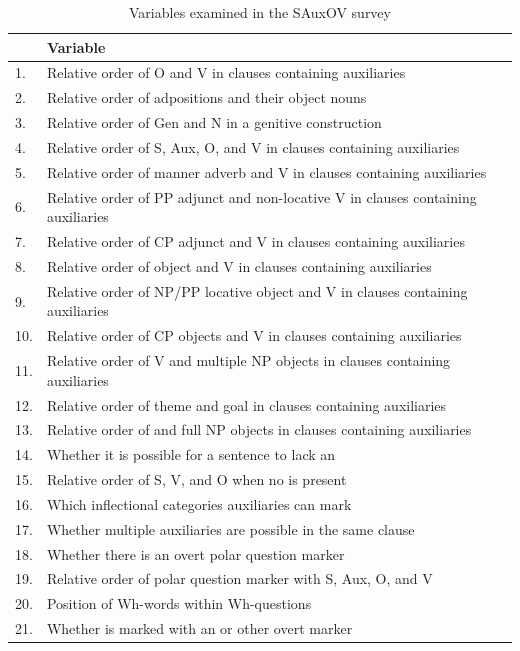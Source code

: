 \documentclass[output=paper,newtxmath,modfonts,nonflat,draftmode]{langsci/langscibook}
\begin{document}
\begin{table}[hp]
\caption{Variables examined in the SAuxOV survey} \label{tab:sande:variables} 
\small
\begin{tabular}{ll}
\lsptoprule
	 & {Variable}\\
	 \midrule
	 1. & Relative order of O and V in clauses containing auxiliaries\\
	 2. & Relative order of adpositions and their object nouns\\
	 3. & Relative order of Gen and N in a genitive construction\\
	 4. & Relative order of S, Aux, O, and V in clauses containing auxiliaries\\
	 5. & Relative order of manner adverb and V in clauses containing auxiliaries\\
	 6. & Relative order of PP adjunct and non-locative V in clauses containing auxiliaries\\
	 7. & Relative order of CP adjunct and V in clauses containing auxiliaries\\
	 8. & Relative order of object \isi{pronoun} and V in clauses containing auxiliaries\\
	 9. & Relative order of NP/PP locative object and V in clauses containing auxiliaries\\
	 10. & Relative order of CP objects and V in clauses containing auxiliaries\\
	 11. & Relative order of V and multiple NP objects in clauses containing auxiliaries\\
	 12. & Relative order of theme and goal in clauses containing auxiliaries\\
	 13. & Relative order of \isi{pronoun} and full NP objects in clauses containing auxiliaries\\
	 14. & Whether it is possible for a sentence to lack an \isi{auxiliary}\\
	 15. & Relative order of S, V, and O when no \isi{auxiliary} is present\\
	 16. & Which inflectional categories auxiliaries can mark\\
	 17. & Whether multiple auxiliaries are possible in the same clause\\
	 18. & Whether there is an overt polar question marker\\
	 19. & Relative order of polar question marker with S, Aux, O, and V\\
	 20. & Position of Wh-words within Wh-questions\\
	 21. & Whether \isi{negation} is marked with an \isi{auxiliary} or other overt marker\\

\end{tabular}
\end{table}
\end{document}

